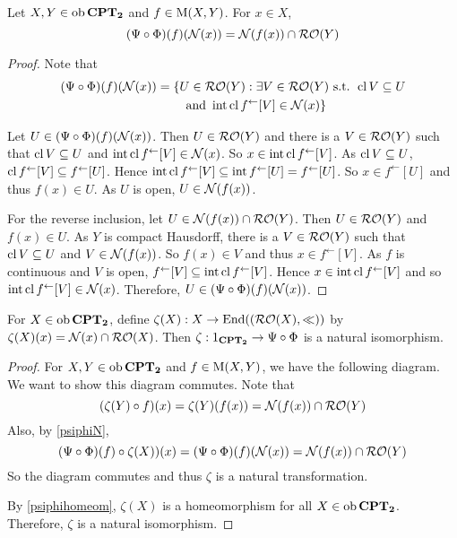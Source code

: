 \begin{lemma}
	\label{psiphiN}
	Let \( X,Y \in \operatorname{ob}{\bf{CPT}_\mathbf{2}} \) and \( f \in \operatorname{M}(X,Y) \).  For \( x \in X \),
	\[ (\Psi \circ \Phi)(f)(\mathcal{N}(x)) = \mathcal{N}(f(x)) \cap \operatorname{\mathcal{RO}}(Y) \]
\end{lemma}
\begin{proof}
	Note that
	\begin{align*}
		(\Psi \circ \Phi)(f)(\mathcal{N}(x)) &= \{ U \in \operatorname{\mathcal{RO}}(Y) : \exists V \in \operatorname{\mathcal{RO}}(Y) \text{ s.t. } \operatorname{cl}{V} \subseteq U \\
		&\qquad \text{ and } \operatorname{int}\operatorname{cl}{f^\leftarrow[V]} \in \mathcal{N}(x) \}
	\end{align*}

	Let \( U \in (\Psi \circ \Phi)(f)(\mathcal{N}(x)) \).  Then \( U \in \operatorname{\mathcal{RO}}(Y) \) and there is a \( V \in \operatorname{\mathcal{RO}}(Y) \) such that \( \operatorname{cl}{V} \subseteq U \) and \( \operatorname{int}\operatorname{cl}{f^\leftarrow[V]} \in \mathcal{N}(x) \).  So \( x \in \operatorname{int}\operatorname{cl}{f^\leftarrow[V]} \).  As \( \operatorname{cl}{V} \subseteq U \), \( \operatorname{cl}{f^\leftarrow[V]} \subseteq f^\leftarrow[U] \).  Hence \( \operatorname{int}\operatorname{cl}{f^\leftarrow[V]} \subseteq \operatorname{int}{f^\leftarrow[U]} = f^\leftarrow[U] \).  So \( x \in f^\leftarrow[U] \) and thus \( f(x) \in U \).  As \( U \) is open, \( U \in \mathcal{N}(f(x)) \).
	
	For the reverse inclusion, let \( U \in \mathcal{N}(f(x)) \cap \operatorname{\mathcal{RO}}(Y) \).  Then \( U \in \operatorname{\mathcal{RO}}(Y) \) and \( f(x) \in U \).  As \( Y \) is compact Hausdorff, there is a \( V \in \operatorname{\mathcal{RO}}(Y) \) such that \( \operatorname{cl}{V} \subseteq U \) and \( V \in \mathcal{N}(f(x)) \).  So \( f(x) \in V \) and thus \( x \in f^\leftarrow[V] \).  As \( f \) is continuous and \( V \) is open, \( f^\leftarrow[V] \subseteq \operatorname{int}\operatorname{cl}{f^\leftarrow[V]} \).  Hence \( x \in \operatorname{int}\operatorname{cl}{f^\leftarrow[V]} \) and so \( \operatorname{int}\operatorname{cl}{f^\leftarrow[V]} \in \mathcal{N}(x) \).  Therefore, \( U \in (\Psi \circ \Phi)(f)(\mathcal{N}(x)) \).
\end{proof}

\begin{theorem}
	\label{zetanatiso}
	For \( X \in \operatorname{ob}{\bf{CPT}_\mathbf{2}} \), define \( \zeta(X): X \to \operatorname{End}((\operatorname{\mathcal{RO}}(X),\ll)) \) by \( \zeta(X)(x) = \mathcal{N}(x) \cap \operatorname{\mathcal{RO}}(X) \).  Then \( \zeta: 1_{\bf{CPT}_\mathbf{2}} \to \Psi \circ \Phi \) is a natural isomorphism.
\end{theorem}
\begin{proof}
	For \( X,Y \in \operatorname{ob}{\bf{CPT}_\mathbf{2}} \) and \( f \in \operatorname{M}(X,Y) \), we have the following diagram.
	We want to show this diagram commutes.  Note that
	\[ (\zeta(Y) \circ f)(x) = \zeta(Y)(f(x)) = \mathcal{N}(f(x)) \cap \operatorname{\mathcal{RO}}(Y) \]
	Also, by \ref{psiphiN},
	\[ (\Psi \circ \Phi)(f) \circ \zeta(X))(x) = (\Psi \circ \Phi)(f)(\mathcal{N}(x)) = \mathcal{N}(f(x)) \cap \operatorname{\mathcal{RO}}(Y) \]
	So the diagram commutes and thus \( \zeta \) is a natural transformation.
	
	By \ref{psiphihomeom}, \( \zeta(X) \) is a homeomorphism for all \( X \in \operatorname{ob}{\bf{CPT}_\mathbf{2}} \).  Therefore, \( \zeta \) is a natural isomorphism.
\end{proof}

